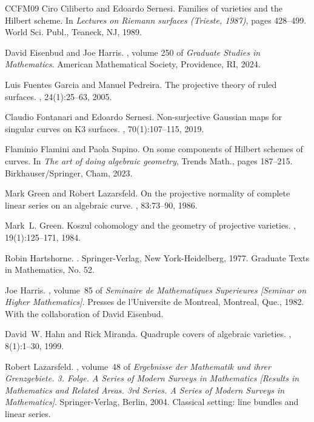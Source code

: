 \documentclass[a4paper,12pt]{amsart}
\begin{document}
\begin{thebibliography}{CCFM09}
Ciro Ciliberto and Edoardo Sernesi.
\newblock Families of varieties and the {H}ilbert scheme.
\newblock In {\em Lectures on {R}iemann surfaces ({T}rieste, 1987)}, pages
  428--499. World Sci. Publ., Teaneck, NJ, 1989.

David Eisenbud and Joe Harris.
, volume 250 of {\em Graduate Studies in Mathematics}.
\newblock American Mathematical Society, Providence, RI, 2024.

Luis {Fuentes Garcia} and Manuel {Pedreira}.
\newblock The projective theory of ruled surfaces.
, 24(1):25--63, 2005.

Claudio Fontanari and Edoardo Sernesi.
\newblock Non-surjective {G}aussian maps for singular curves on {K}3 surfaces.
, 70(1):107--115, 2019.

Flaminio Flamini and Paola Supino.
\newblock On some components of {H}ilbert schemes of curves.
\newblock In {\em The art of doing algebraic geometry}, Trends Math., pages
  187--215. Birkhauser/Springer, Cham, 2023.

Mark Green and Robert Lazarsfeld.
\newblock On the projective normality of complete linear series on an algebraic
  curve.
, 83:73--90, 1986.

Mark~L. Green.
\newblock Koszul cohomology and the geometry of projective varieties.
, 19(1):125--171, 1984.

Robin Hartshorne.
.
\newblock Springer-Verlag, New York-Heidelberg, 1977.
\newblock Graduate Texts in Mathematics, No. 52.

Joe Harris.
, volume~85 of {\em Seminaire de
  Mathematiques Superieures [Seminar on Higher Mathematics]}.
\newblock Presses de l'Universite de Montreal, Montreal, Que., 1982.
\newblock With the collaboration of David Eisenbud.

David~W. Hahn and Rick Miranda.
\newblock Quadruple covers of algebraic varieties.
, 8(1):1--30, 1999.

Robert Lazarsfeld.
, volume~48 of {\em
  Ergebnisse der Mathematik und ihrer Grenzgebiete. 3. Folge. A Series of
  Modern Surveys in Mathematics [Results in Mathematics and Related Areas. 3rd
  Series. A Series of Modern Surveys in Mathematics]}.
\newblock Springer-Verlag, Berlin, 2004.
\newblock Classical setting: line bundles and linear series.


\end{thebibliography}
\end{document}
